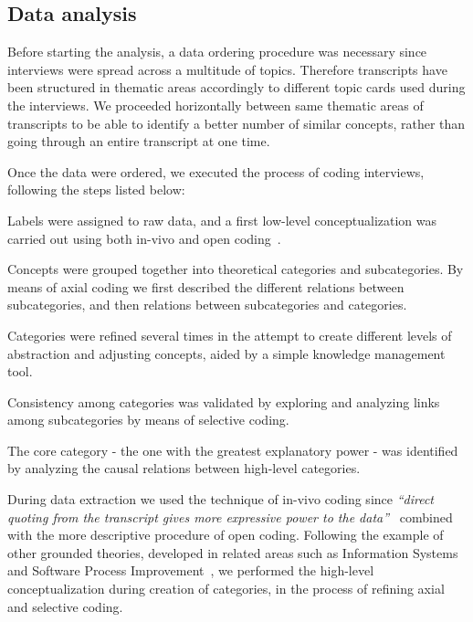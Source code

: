 \documentclass[10pt,journal,letterpaper,compsoc]{IEEEtran}
\begin{document}
\subsection{Data analysis} 
Before starting the analysis, a data ordering procedure was necessary since 
interviews were spread across a multitude of topics. Therefore transcripts have 
been structured in thematic areas accordingly to different topic cards used 
during the interviews. We proceeded horizontally between same thematic areas of 
transcripts to be able to identify a better number of similar concepts, rather 
than going through an entire transcript at one time.

Once the data were ordered, we executed the process of coding interviews,
following the steps listed below:


\begin{compactitem}

\item Labels were assigned to raw data, and a first low-level conceptualization
was carried out using both in-vivo and open coding~\cite{ColinRobson2009}. 
\item Concepts were grouped together into theoretical categories and 
subcategories. By means of axial coding we first described the different 
relations between subcategories, and then relations between subcategories and 
categories. 
\item Categories were refined several times in the attempt to create different 
levels of abstraction and adjusting concepts, aided by a simple knowledge 
management tool. 
\item Consistency among categories was validated by exploring and
analyzing links among subcategories by means of selective coding. 
\item The core category - the one with the greatest explanatory power - was 
identified by analyzing the causal relations between high-level categories. 
\end{compactitem}


During data extraction we used the technique of in-vivo coding since
\textit{``direct quoting from the transcript gives more expressive power to the
data''}~\cite{ColinRobson2009} combined with the more descriptive procedure of
open coding. Following the example of other grounded theories, developed in
related areas such as Information Systems~\cite{Orlikowski1993} and Software
Process Improvement~\cite{Coleman2006}, we performed the high-level
conceptualization during creation of categories, in the process of refining
axial and selective coding.
\end{document}
